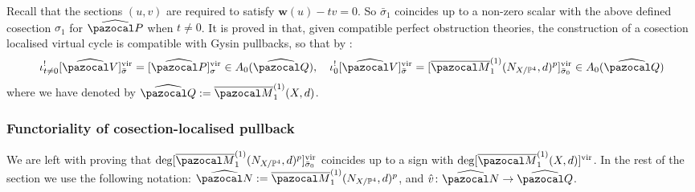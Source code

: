 \documentclass[11pt]{amsart}
\newcommand{\Mone}[3]{\overline{\pazocal M}^{(1)}_{#1}(#2,#3)}
\newcommand{\PP}{\mathbb P}
\renewcommand{\to}{\rightarrow}
\newcommand{\hP}{\widehat{\mathfrak P}}
\newcommand{\w}{\mathbf{w}}
\theoremstyle{plain}
\theoremstyle{definition}
\begin{document}
Recall that the sections $(u,v)$ are required to satisfy $\w(u)-tv=0$. So $\bar\sigma_1$ coincides up to a non-zero scalar with the above defined cosection $\sigma_1$ for $\widehat{\pazocal P}$ when $t\neq 0$. It is proved in \cite[Theorem 5.2]{KLcosection} that, given compatible perfect obstruction theories, the construction of a cosection localised virtual cycle is compatible with Gysin pullbacks, so that by \cite[Proposition 4.9]{CLpfields}:
\[
 \iota_{t\neq0}^![\widehat{\pazocal V}]^{\rm{vir}}_{\rm{\bar\sigma}}=[\widehat{\pazocal P}]^{\rm{vir}}_{\rm{\sigma}}\in A_0(\widehat{\pazocal Q}),\quad \iota_{0}^![\widehat{\pazocal V}]^{\rm{vir}}_{\rm{\bar\sigma}}=[\Mone{1}{N_{X/\PP^4}}{d}^p]^{\rm{vir}}_{\rm{\bar\sigma_0}}\in A_0(\widehat{\pazocal Q})
\]
where we have denoted by $\widehat{\pazocal Q}:=\Mone{1}{X}{d}$.
\subsubsection*{Functoriality of cosection-localised pullback}
We are left with proving that $\deg[\Mone{1}{N_{X/\PP^4}}{d}^p]^{\rm{vir}}_{\rm{\bar\sigma_0}}$ coincides up to a sign with $\deg[\Mone{1}{X}{d}]^{\rm{vir}}$.
In the rest of the section we use the following notation: $\widehat{\pazocal N}:=\Mone{1}{N_{X/\PP^4}}{d}^p$, and $\hat v\colon\widehat{\pazocal N}\to\widehat{\pazocal Q}$. 
\end{document}
